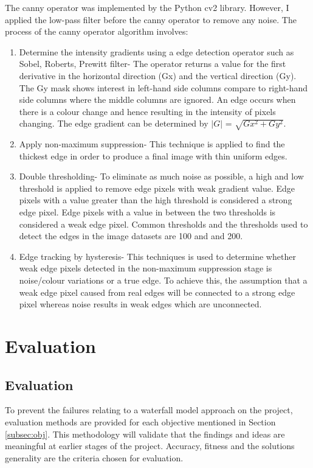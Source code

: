 The canny operator was implemented by the Python cv2 library. However, I applied the low-pass filter before the canny operator to remove any noise. The process of the canny operator algorithm involves:
\begin{enumerate}
	\item Determine the intensity gradients using a edge detection operator such as Sobel, Roberts, Prewitt filter- The operator returns a value for the first derivative in the horizontal direction (Gx) and the vertical direction (Gy). The Gy mask shows interest in left-hand side columns compare to right-hand side columns where the middle columns are ignored. An edge occurs when there is a colour change and hence resulting in the intensity of pixels changing. The edge gradient can be determined by $|G|$ = $\sqrt{Gx^{2} + Gy^{2}} $. 
	
	\item Apply non-maximum suppression- This technique is applied to find the thickest edge in order to produce a final image with thin uniform edges.
	\item Double thresholding- To eliminate as much noise as possible, a high and low threshold is applied to remove edge pixels with weak gradient value. Edge pixels with a value greater than the high threshold is considered a strong edge pixel. Edge pixels with a value in between the two thresholds is considered a weak edge pixel. Common thresholds and the thresholds used to detect the edges in the image datasets are 100 and and 200.
	\item Edge tracking by hysteresis- This techniques is used to determine whether weak edge pixels detected in the non-maximum suppression stage is noise/colour variations or a true edge. To achieve this, the assumption that a weak edge pixel caused from real edges will be connected to a strong edge pixel whereas noise results in weak edges which are unconnected. 
	
\end{enumerate}

\chapter{Evaluation}
\section{Evaluation} \label{sec:eval}
To prevent the failures relating to a waterfall model approach on the project, evaluation methods are provided for each objective mentioned in Section \ref{subsec:obj}. This methodology will validate that the findings and ideas are  meaningful at earlier stages of the project. Accuracy, fitness and the solution\textquotesingle s generality are the criteria chosen for evaluation.


